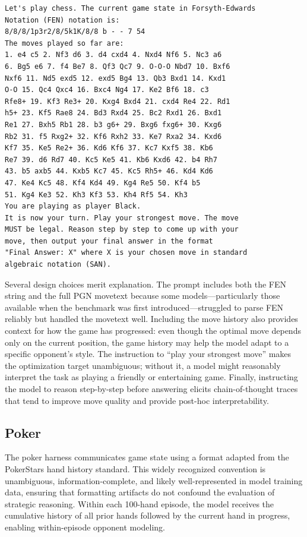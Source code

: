 \documentclass{article}
\begin{document}
\begin{verbatim}
Let's play chess. The current game state in Forsyth-Edwards
Notation (FEN) notation is:
8/8/8/1p3r2/8/5k1K/8/8 b - - 7 54
The moves played so far are:
1. e4 c5 2. Nf3 d6 3. d4 cxd4 4. Nxd4 Nf6 5. Nc3 a6
6. Bg5 e6 7. f4 Be7 8. Qf3 Qc7 9. O-O-O Nbd7 10. Bxf6
Nxf6 11. Nd5 exd5 12. exd5 Bg4 13. Qb3 Bxd1 14. Kxd1
O-O 15. Qc4 Qxc4 16. Bxc4 Ng4 17. Ke2 Bf6 18. c3
Rfe8+ 19. Kf3 Re3+ 20. Kxg4 Bxd4 21. cxd4 Re4 22. Rd1
h5+ 23. Kf5 Rae8 24. Bd3 Rxd4 25. Bc2 Rxd1 26. Bxd1
Re1 27. Bxh5 Rb1 28. b3 g6+ 29. Bxg6 fxg6+ 30. Kxg6
Rb2 31. f5 Rxg2+ 32. Kf6 Rxh2 33. Ke7 Rxa2 34. Kxd6
Kf7 35. Ke5 Re2+ 36. Kd6 Kf6 37. Kc7 Kxf5 38. Kb6
Re7 39. d6 Rd7 40. Kc5 Ke5 41. Kb6 Kxd6 42. b4 Rh7
43. b5 axb5 44. Kxb5 Kc7 45. Kc5 Rh5+ 46. Kd4 Kd6
47. Ke4 Kc5 48. Kf4 Kd4 49. Kg4 Re5 50. Kf4 b5
51. Kg4 Ke3 52. Kh3 Kf3 53. Kh4 Rf5 54. Kh3
You are playing as player Black.
It is now your turn. Play your strongest move. The move
MUST be legal. Reason step by step to come up with your
move, then output your final answer in the format
"Final Answer: X" where X is your chosen move in standard
algebraic notation (SAN).
\end{verbatim}

Several design choices merit explanation. The prompt includes both the FEN string and the full PGN movetext because some models---particularly those available when the benchmark was first introduced---struggled to parse FEN reliably but handled the movetext well. Including the move history also provides context for how the game has progressed: even though the optimal move depends only on the current position, the game history may help the model adapt to a specific opponent's style. The instruction to ``play your strongest move'' makes the optimization target unambiguous; without it, a model might reasonably interpret the task as playing a friendly or entertaining game. Finally, instructing the model to reason step-by-step before answering elicits chain-of-thought traces that tend to improve move quality and provide post-hoc interpretability.


\subsection{Poker}
\label{app:poker_prompt}

The poker harness communicates game state using a format adapted from the PokerStars hand history standard. This widely recognized convention is unambiguous, information-complete, and likely well-represented in model training data, ensuring that formatting artifacts do not confound the evaluation of strategic reasoning. Within each 100-hand episode, the model receives the cumulative history of all prior hands followed by the current hand in progress, enabling within-episode opponent modeling.
\end{document}
